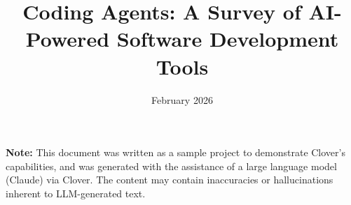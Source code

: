 \documentclass[11pt]{article}
\title{Coding Agents: A Survey of AI-Powered Software Development Tools}
\author{}
\date{February 2026}
\begin{document}
\maketitle

\vspace{-1em}
\noindent\textbf{Note:} This document was written as a sample project to demonstrate Clover's capabilities, and was generated with the assistance of a large language model (Claude) via Clover. The content may contain inaccuracies or hallucinations inherent to LLM-generated text.
\vspace{1em}

\begin{abstract}

\end{abstract}














\end{document}

